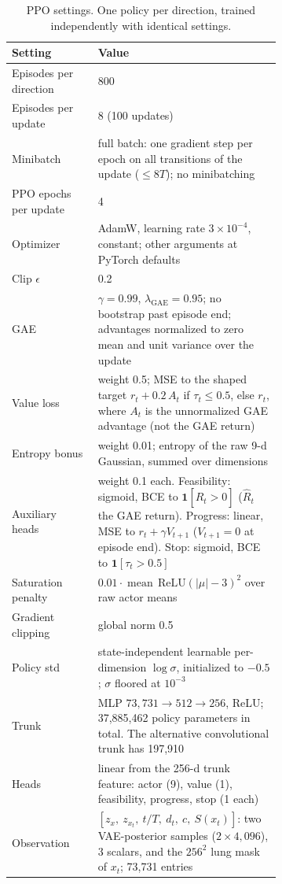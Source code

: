 \begin{table}[t]
\centering
\caption{PPO settings. One policy per direction, trained independently with identical settings.}
\label{tab:repro-ppo}
\small
\begin{tabular}{@{}l p{0.68\linewidth}@{}}
\toprule
Setting & Value \\
\midrule
Episodes per direction & 800 \\
Episodes per update & 8 (100 updates) \\
Minibatch & full batch: one gradient step per epoch on all transitions of the update ($\leq 8T$); no minibatching \\
PPO epochs per update & 4 \\
Optimizer & AdamW, learning rate $3 \times 10^{-4}$, constant; other arguments at PyTorch defaults \\
Clip $\epsilon$ & 0.2 \\
GAE & $\gamma = 0.99$, $\lambda_{\text{GAE}} = 0.95$; no bootstrap past episode end; advantages normalized to zero mean and unit variance over the update \\
Value loss & weight 0.5; MSE to the shaped target $r_t + 0.2\,A_t$ if $\tau_t \leq 0.5$, else $r_t$, where $A_t$ is the unnormalized GAE advantage (not the GAE return) \\
Entropy bonus & weight 0.01; entropy of the raw 9-d Gaussian, summed over dimensions \\
Auxiliary heads & weight 0.1 each. Feasibility: sigmoid, BCE to $\mathbf{1}[\hat R_t > 0]$ ($\hat R_t$ the GAE return). Progress: linear, MSE to $r_t + \gamma V_{t+1}$ ($V_{t+1} = 0$ at episode end). Stop: sigmoid, BCE to $\mathbf{1}[\tau_t > 0.5]$ \\
Saturation penalty & $0.01 \cdot \operatorname{mean}\,\mathrm{ReLU}(|\mu| - 3)^2$ over raw actor means \\
Gradient clipping & global norm 0.5 \\
Policy std & state-independent learnable per-dimension $\log\sigma$, initialized to $-0.5$; $\sigma$ floored at $10^{-3}$ \\
Trunk & MLP $73{,}731 \to 512 \to 256$, ReLU; 37{,}885{,}462 policy parameters in total. The alternative convolutional trunk has 197{,}910 \\
Heads & linear from the 256-d trunk feature: actor (9), value (1), feasibility, progress, stop (1 each) \\
Observation & $[z_x,\ z_{x_t},\ t/T,\ d_t,\ c,\ S(x_t)]$: two VAE-posterior samples ($2 \times 4{,}096$), 3 scalars, and the $256^2$ lung mask of $x_t$; 73{,}731 entries \\

\end{tabular}
\end{table}
